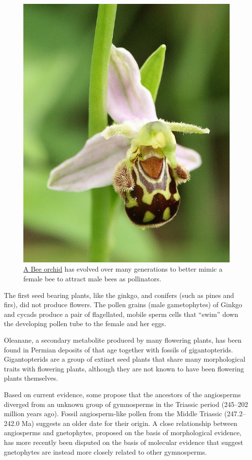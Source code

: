 \begin{figure}

{\centering \includegraphics[width=0.7\linewidth]{./figures/plants/Ophrys_apifera_flower1} 

}

\caption{\href{https://commons.wikimedia.org/wiki/File:Ophrys_apifera_flower1.jpg}{A Bee orchid} has evolved over many generations to better mimic a female bee to attract male bees as pollinators.}\label{fig:beeorchid}
\end{figure}

The first seed bearing plants, like the ginkgo, and conifers (such as pines and firs), did not produce flowers. The pollen grains (male gametophytes) of Ginkgo and cycads produce a pair of flagellated, mobile sperm cells that ``swim'' down the developing pollen tube to the female and her eggs.

Oleanane, a secondary metabolite produced by many flowering plants, has been found in Permian deposits of that age together with fossils of gigantopterids. Gigantopterids are a group of extinct seed plants that share many morphological traits with flowering plants, although they are not known to have been flowering plants themselves.

Based on current evidence, some propose that the ancestors of the angiosperms diverged from an unknown group of gymnosperms in the Triassic period (245--202 million years ago). Fossil angiosperm-like pollen from the Middle Triassic (247.2--242.0 Ma) suggests an older date for their origin. A close relationship between angiosperms and gnetophytes, proposed on the basis of morphological evidence, has more recently been disputed on the basis of molecular evidence that suggest gnetophytes are instead more closely related to other gymnosperms.

